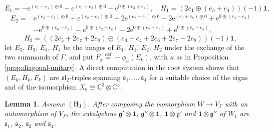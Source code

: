 \documentclass[leqno]{article}
\newcommand{\Cbb}{\ensuremath{\mathbb{C}}}
\newcommand{\ot}{\otimes}
\newcommand{\ov}{\overset}
\newcommand{\e}{\mathrm{e}} %
\newtheorem{lemma}[thm]{Lemma}
\numberwithin{equation}{section}
\begin{document}
\[
E_1 = -\e^{(e_1-e_2) \oplus 0}-\e^{(e_1+e_2) \oplus 0}-\e^{0 \oplus (e_3+e_4)},\quad H_1 = (2e_1 \oplus (e_3+e_4))(-1)\mathbf 1,
\]
\[
\begin{aligned}
E_2 = {}&\e^{(e_5-e_2) \oplus 0}+\e^{(e_2+e_5) \oplus 0}+2\e^{(e_7-e_6) \oplus 0}-2\e^{(e_6+e_8) \oplus 0}+\e^{0 \oplus (e_3-e_4)}\\
&-\e^{0 \oplus (e_6-e_2)}-\e^{0 \oplus (e_2+e_6)}-2\e^{0 \oplus (e_7-e_5)}+\e^{0 \oplus (e_5-e_8)},
\end{aligned}
\]
\[
H_2 = ((2e_5+2e_7+2e_8) \oplus (e_3-e_4+2e_6+2e_7-2e_8))(-1)\mathbf 1,
\]
let $E_3$, $H_3$, $E_4$, $H_4$ be the images of $E_1$, $H_1$, $E_2$, $H_2$ under the exchange of the two summands of $\Gamma$, and put $F_k \ov{\mathrm{def}}{=} -\phi_\kappa(E_k)$, with $\kappa$ as in Proposition \ref{prop:diagonal-unitary}. A direct computation in the root system shows that $(E_k,H_k,F_k)$ are $\mathfrak{sl}_2$-triples spanning $\mathfrak s_1, \ldots, \mathfrak s_4$ for a suitable choice of the signs and of the isomorphism $X_9 \cong \Cbb^3 \ot \Cbb^3$.

\begin{lemma}
\label{lem:sl2-four}
Assume $\mathrm{(H_J)}$. After composing the isomorphism $W \to V_\Gamma$ with an automorphism of $V_\Gamma$, the subalgebras $\mathfrak g' \ot \mathbf 1$, $\mathfrak g'' \ot \mathbf 1$, $\mathbf 1 \ot \mathfrak g'$ and $\mathbf 1 \ot \mathfrak g''$ of $W_1$ are $\mathfrak s_1$, $\mathfrak s_2$, $\mathfrak s_3$ and $\mathfrak s_4$.
\end{lemma}
\end{document}
